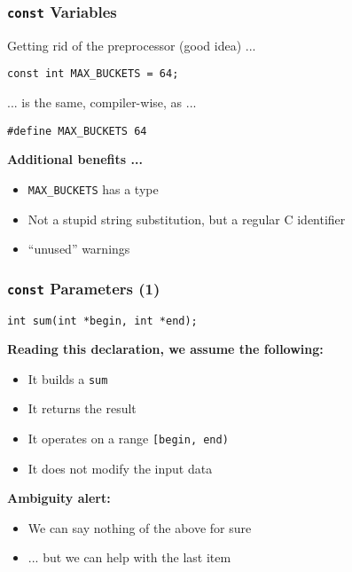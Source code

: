\begin{frame}[fragile]
  \frametitle{\texttt{const} Variables}

  Getting rid of the preprocessor (good idea) ...

  \begin{block}{}
\begin{verbatim}
const int MAX_BUCKETS = 64;
\end{verbatim}
  \end{block}

  ... is the same, compiler-wise, as ...

  \begin{block}{}
\begin{verbatim}
#define MAX_BUCKETS 64
\end{verbatim}
  \end{block}

  \textbf{Additional benefits ...}

  \begin{itemize}
  \item \texttt{MAX\_BUCKETS} has a type
  \item Not a stupid string substitution, but a regular C identifier
  \item ``unused'' warnings
  \end{itemize}

\end{frame}

\begin{frame}[fragile]
  \frametitle{\texttt{const} Parameters (1)}

  \begin{block}{}
\begin{verbatim}
int sum(int *begin, int *end);
\end{verbatim}
  \end{block}

  \textbf{Reading this declaration, we assume the following:}

  \begin{itemize}
  \item It builds a \texttt{sum} 
  \item It returns the result
  \item It operates on a range \texttt{[begin, end)}
  \item It does not modify the input data
  \end{itemize}
  
  \textbf{Ambiguity alert:}

  \begin{itemize}
  \item We can say nothing of the above for sure
  \item ... but we can help with the last item
  \end{itemize}

\end{frame}

